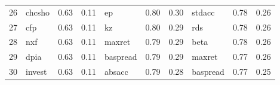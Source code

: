 \documentclass[12pt]{article}
\begin{document}
\begin{landscape}
\begin{footnotesize}
\begin{longtable}{l|lcc|lcc|lcc}
			26                    & chcsho                      & 0.63                                                                                 & 0.11                            & ep                          & 0.80                                                                                 & 0.30                            & stdacc                      & 0.78                                                                                 & 0.26                           \\
			27                    & cfp                         & 0.63                                                                                 & 0.11                            & kz                          & 0.80                                                                                 & 0.29                            & rds                         & 0.78                                                                                 & 0.26                           \\
			28                    & nxf                         & 0.63                                                                                 & 0.11                            & maxret                      & 0.79                                                                                 & 0.29                            & beta                        & 0.78                                                                                 & 0.26                           \\
			29                    & dpia                        & 0.63                                                                                 & 0.11                            & baspread                    & 0.79                                                                                 & 0.29                            & maxret                      & 0.77                                                                                 & 0.26                           \\
			30                    & invest                      & 0.63                                                                                 & 0.11                            & absacc                      & 0.79                                                                                 & 0.28                            & baspread                    & 0.77                                                                                 & 0.25                           \\

\end{longtable}
\end{footnotesize}
\end{landscape}
\end{document}

